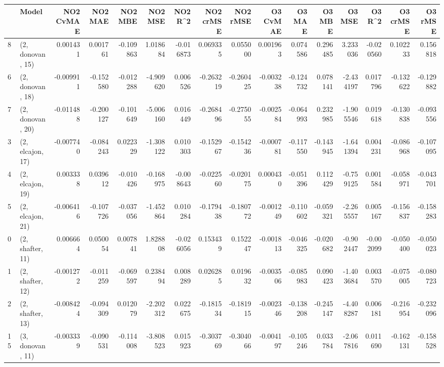\begin{tabular}{llrrrrrrrrrrrrrr}
\toprule
{} &             Model &  NO2 CvMAE &   NO2 MAE &   NO2 MBE &    NO2 MSE &   NO2 R\textasciicircum2 &  NO2 crMSE &  NO2 rMSE &  O3 CvMAE &    O3 MAE &    O3 MBE &     O3 MSE &    O3 R\textasciicircum2 &  O3 crMSE &   O3 rMSE \\
\midrule
8  &  (2, donovan, 15) &   0.001431 &  0.001761 & -0.109863 &   1.018684 & -0.016873 &   0.069335 &  0.055000 &  0.001963 &  0.074586 &  0.296485 &   3.233036 & -0.020560 &  0.102233 &  0.156818 \\
6  &  (2, donovan, 18) &  -0.009911 & -0.152580 & -0.012288 &  -4.909620 &  0.006526 &  -0.263219 & -0.260425 & -0.003238 & -0.124732 &  0.078141 &  -2.434197 &  0.017796 & -0.132622 & -0.129882 \\
7  &  (2, donovan, 20) &  -0.011488 & -0.200127 & -0.101649 &  -5.006160 &  0.016449 &  -0.268496 & -0.275055 & -0.002584 & -0.064993 &  0.232985 &  -1.905546 &  0.019618 & -0.130838 & -0.093556 \\
3  &  (2, elcajon, 17) &  -0.007740 & -0.084243 &  0.022329 &  -1.308122 &  0.010303 &  -0.152967 & -0.154236 & -0.000781 & -0.117550 & -0.143945 &  -1.641394 &  0.004231 & -0.086968 & -0.107095 \\
4  &  (2, elcajon, 19) &   0.003338 &  0.039612 & -0.010426 &  -0.168975 & -0.008643 &  -0.022560 & -0.020175 &  0.000430 & -0.051396 &  0.112429 &  -0.759125 &  0.001584 & -0.058971 & -0.043701 \\
5  &  (2, elcajon, 21) &  -0.006416 & -0.107726 & -0.037056 &  -1.452864 &  0.010284 &  -0.179438 & -0.180772 & -0.001249 & -0.110602 & -0.059321 &  -2.265557 &  0.005167 & -0.156837 & -0.158283 \\
0  &  (2, shafter, 11) &   0.006664 &  0.050054 &  0.007841 &   1.828808 & -0.026056 &   0.153439 &  0.152247 & -0.001813 & -0.046325 & -0.020682 &  -0.902447 & -0.002099 & -0.050400 & -0.050023 \\
1  &  (2, shafter, 12) &  -0.001272 & -0.011259 & -0.069597 &   0.238494 &  0.008289 &   0.026285 &  0.019632 & -0.003506 & -0.085983 &  0.090423 &  -1.403684 &  0.003570 & -0.075005 & -0.080723 \\
2  &  (2, shafter, 13) &  -0.008424 & -0.094309 &  0.012079 &  -2.202312 &  0.022675 &  -0.181534 & -0.181915 & -0.002346 & -0.138208 & -0.245147 &  -4.408287 &  0.006181 & -0.216954 & -0.232096 \\
15 &  (3, donovan, 11) &  -0.003339 & -0.090531 & -0.114008 &  -3.808523 &  0.015923 &  -0.303769 & -0.304066 & -0.004197 & -0.105246 &  0.033784 &  -2.067816 &  0.011690 & -0.162131 & -0.158528 \\

\end{tabular}

